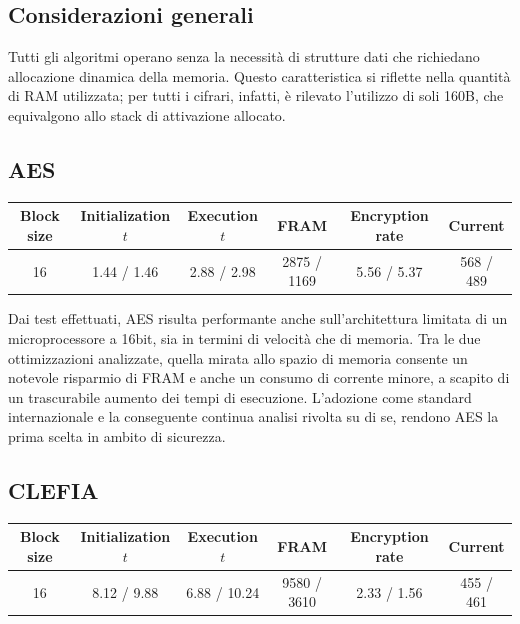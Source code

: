 \documentclass[target=bach,aauheader=,style=]{thud}
\begin{document}
		\subsection{Considerazioni generali}
		Tutti gli algoritmi operano senza la necessità di strutture dati che richiedano allocazione dinamica della memoria. Questo caratteristica si riflette nella quantità di RAM utilizzata; per tutti i cifrari, infatti, è rilevato l'utilizzo di soli 160B, che equivalgono allo stack di attivazione allocato.
		\subsection{AES}
		\begin{center}
			\begin{tabular}{|c| *{5}{c|}}
				\hline
				\textbf{Block size} & \textbf{Initialization} $t$& \textbf{Execution} $t$ & \textbf{FRAM} & \textbf{Encryption rate} & \textbf{Current}\\
				\hline
				16 & \textcolor{Mahogany}{1.44} / \textcolor{OliveGreen}{1.46} & \textcolor{Mahogany}{2.88} / \textcolor{OliveGreen}{2.98} & \textcolor{Mahogany}{2875} / \textcolor{OliveGreen}{1169} & \textcolor{Mahogany}{5.56} / \textcolor{OliveGreen}{5.37} & \textcolor{Mahogany}{568} / \textcolor{OliveGreen}{489} \\
				\hline
			\end{tabular}
		\end{center}
		
		Dai test effettuati, AES risulta performante anche sull'architettura limitata di un microprocessore a 16bit, sia in termini di velocità che di memoria. Tra le due ottimizzazioni analizzate, quella mirata allo spazio di memoria consente un notevole risparmio di FRAM e anche un consumo di corrente minore, a scapito di un trascurabile aumento dei tempi di esecuzione.
		L'adozione come standard internazionale e la conseguente continua analisi rivolta su di se, rendono AES la prima scelta in ambito di sicurezza.
		\subsection{CLEFIA}
		\begin{center}
			\begin{tabular}{|c| *{5}{c|}}
				\hline
				\textbf{Block size} & \textbf{Initialization} $t$& \textbf{Execution} $t$ & \textbf{FRAM} & \textbf{Encryption rate} & \textbf{Current} \\
				\hline
				16 & \textcolor{Mahogany}{8.12} / \textcolor{OliveGreen}{9.88} & \textcolor{Mahogany}{6.88} / \textcolor{OliveGreen}{10.24} & \textcolor{Mahogany}{9580} / \textcolor{OliveGreen}{3610} & \textcolor{Mahogany}{2.33} / \textcolor{OliveGreen}{1.56} & \textcolor{Mahogany}{455} / \textcolor{OliveGreen}{461} \\
				\hline
			\end{tabular}
		\end{center}
		
\end{document}
